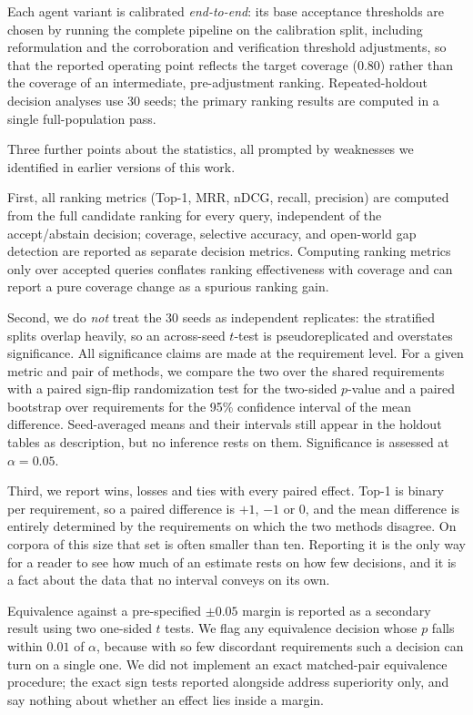 \documentclass[a4paper,fleqn]{cas-sc}
\begin{document}
Each agent variant is calibrated \emph{end-to-end}: its base acceptance thresholds are chosen by running the complete pipeline on the calibration split, including reformulation and the corroboration and verification threshold adjustments, so that the reported operating point reflects the target coverage (0.80) rather than the coverage of an intermediate, pre-adjustment ranking. Repeated-holdout decision analyses use 30 seeds; the primary ranking results are computed in a single full-population pass.

\label{sec:protocol-stats}
Three further points about the statistics, all prompted by weaknesses we identified in earlier versions of this work.

First, all ranking metrics (Top-1, MRR, nDCG, recall, precision) are computed from the full candidate ranking for every query, independent of the accept/abstain decision; coverage, selective accuracy, and open-world gap detection are reported as separate decision metrics. Computing ranking metrics only over accepted queries conflates ranking effectiveness with coverage and can report a pure coverage change as a spurious ranking gain.

Second, we do \emph{not} treat the 30 seeds as independent replicates: the stratified splits overlap heavily, so an across-seed $t$-test is pseudoreplicated and overstates significance. All significance claims are made at the requirement level. For a given metric and pair of methods, we compare the two over the shared requirements with a paired sign-flip randomization test for the two-sided $p$-value and a paired bootstrap over requirements for the 95\% confidence interval of the mean difference. Seed-averaged means and their intervals still appear in the holdout tables as description, but no inference rests on them. Significance is assessed at $\alpha = 0.05$.

Third, we report wins, losses and ties with every paired effect. Top-1 is binary per requirement, so a paired difference is $+1$, $-1$ or $0$, and the mean difference is entirely determined by the requirements on which the two methods disagree. On corpora of this size that set is often smaller than ten. Reporting it is the only way for a reader to see how much of an estimate rests on how few decisions, and it is a fact about the data that no interval conveys on its own.

Equivalence against a pre-specified $\pm 0.05$ margin is reported as a secondary result using two one-sided $t$ tests. We flag any equivalence decision whose $p$ falls within $0.01$ of $\alpha$, because with so few discordant requirements such a decision can turn on a single one. We did not implement an exact matched-pair equivalence procedure; the exact sign tests reported alongside address superiority only, and say nothing about whether an effect lies inside a margin.
\end{document}
